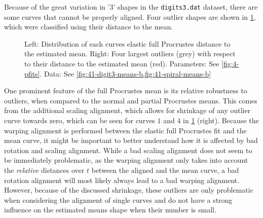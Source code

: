 Because of the great variation in '3' shapes in the \texttt{digits3.dat} dataset, there are some curves that cannot be properly aligned.
Four outlier shapes are shown in \cref{fig:4-outliers}, which were classified using their distance to the mean. 
\begin{figure}
  \centering
  \begin{subfigure}{0.40\textwidth}
    \centering
  \end{subfigure}
  \begin{subfigure}{0.48\textwidth}
    \centering
  \end{subfigure}
  \caption{Left: Distribution of each curves elastic full Procrustes distance to the estimated mean.
  Right: Four largest outliers (grey) with respect to their distance to the estimated mean (red).
  Parameters: See \cref{fig:4-pfits}. 
  Data: See \cref{fig:41-digit3-means-b,fig:41-spiral-means-b}}
  \label{fig:4-outliers}
\end{figure}
One prominent feature of the full Procrustes mean is its relative robustness to outliers, when compared to the normal and partial Procrustes means.
This comes from the additional scaling alignment, which allows for shrinkage of any outlier curve towards zero, which can be seen for curves $1$ and $4$ in \cref{fig:4-outliers} (right).
Because the warping alignment is performed between the elastic full Procrustes fit and the mean curve, it might be important to better understand how it is affected by bad rotation and scaling alignment.
While a bad scaling alignment does not seem to be immediately problematic, as the warping alignment only takes into account the \emph{relative} distances over $t$ between the aligned and the mean curve, a bad rotation alignment will most likely always lead to a bad warping alignment.
However, because of the discussed shrinkage, these outliers are only problematic when considering the alignment of single curves and do not have a strong influence on the estimated means shape when their number is small.


